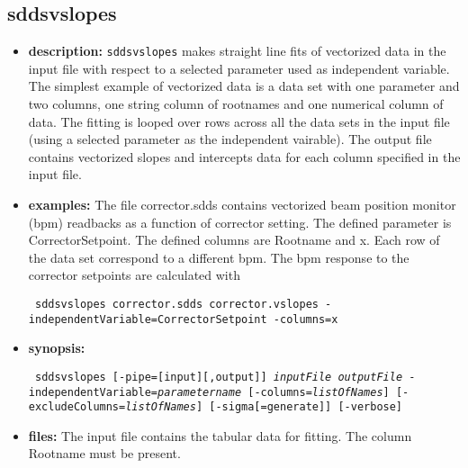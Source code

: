 %
\newpage

%
%
\subsection{sddsvslopes}
\label{sddsvslopes}

\begin{itemize}
\item {\bf description:}
%
%
\verb|sddsvslopes| makes straight line fits of vectorized data
in the input file with respect to a selected parameter used as independent variable.
The simplest example of vectorized data is a data set with one parameter and two columns,
one string column of rootnames and one numerical column of data.
The fitting is looped over rows across all the 
data sets in the input file (using a selected parameter as the
independent vairable). The output file contains
vectorized slopes and intercepts data for each column specified in the input file.

\item {\bf examples:} 
%
% 
%
The file corrector.sdds contains vectorized  beam position monitor (bpm)
readbacks as a function of corrector setting. The defined parameter is CorrectorSetpoint.
The defined columns are Rootname and x. Each row of the data set correspond to a different
bpm.
The bpm response to the corrector setpoints are calculated with
\begin{flushleft}{\tt
sddsvslopes corrector.sdds corrector.vslopes -independentVariable=CorrectorSetpoint 
  -columns=x
}\end{flushleft}
\item {\bf synopsis:} 
%
%
\begin{flushleft}{\tt
sddsvslopes [-pipe=[input][,output]] {\em inputFile} {\em outputFile} 
        -independentVariable={\em parametername}
        [-columns={\em listOfNames}] [-excludeColumns={\em listOfNames}] 
        [-sigma[=generate]] [-verbose]
}\end{flushleft}
\item {\bf files:}
The input file contains the tabular data for fitting. The column Rootname must be present.


\end{itemize}
